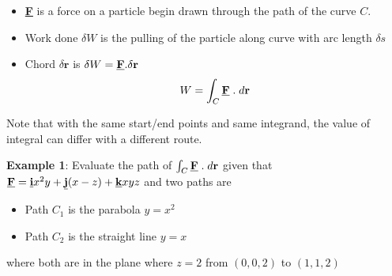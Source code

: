 \documentclass[10pt,a4paper]{article}
\begin{document}
\begin{itemize}
    \item \textbf{\underline{F}} is a force on a particle begin drawn through the path
    of the curve $C$.
    \item Work done $\delta W$ is the pulling of the particle along curve with arc length $\delta s$ 
    \item Chord $\delta \textbf{r}$ is $\delta W = \textbf{\underline{F}}.\delta \textbf{r}$
    $$
        W = \int_C \textbf{\underline{F}}\;.\; d \textbf{r}
    $$
\end{itemize}

Note that with the same start/end points and same integrand, the value of integral can differ with a different route.

\textbf{Example 1}: Evaluate the path of $\int_C \textbf{\underline{F}}\;.\; d \textbf{r}$ given that
$\textbf{\underline{F}}=\textbf{\underline{i}}x^2y +
\textbf{\underline{j}}(x-z)+\textbf{\underline{k}}xyz$ and two paths are
\begin{itemize}
    \item Path $C_1$ is the parabola $y=x^2$
    \item Path $C_2$ is the straight line $y=x$
\end{itemize}  
where both are in the plane where $z=2$ from $(0,0,2)$ to $(1,1,2)$
\end{document}
